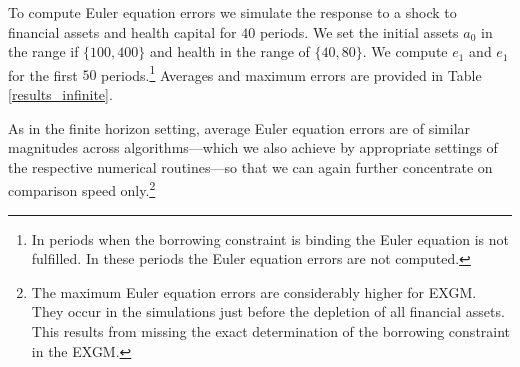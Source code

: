 \documentclass[a4paper,12pt]{article}
\begin{document}
To compute Euler equation errors we simulate the response to a shock to financial assets and health capital for $40$ periods. We set the initial assets $a_{0}$ in the range if $\{100,400\}$ and health in the range of $\{40,80\}$. We compute $e_{1}$ and $e_{1}$ for the first $50$ periods.\footnote{In periods when the borrowing constraint is binding the Euler equation is not fulfilled. In these periods the Euler equation errors are not computed.}  Averages and maximum errors are provided in Table \ref{results_infinite}.

As in the finite horizon setting, average Euler equation errors are of similar magnitudes across algorithms---which we also achieve by appropriate settings of the respective numerical routines---so that we can again further concentrate on comparison speed only.\footnote{The maximum Euler equation errors are considerably higher for EXGM. They occur in the simulations just before the depletion of all financial assets. This results from missing the exact determination of the borrowing constraint in the EXGM.}
\end{document}
